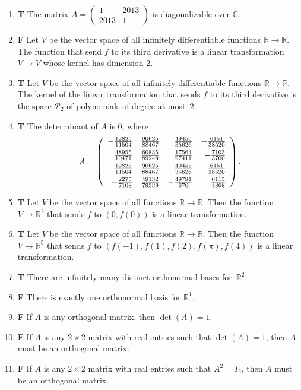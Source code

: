 \documentclass[12pt]{article}
\newcommand{\tf}[2]{\item {\bf {\color{blue}\hspace{1em}#1}}\hspace{1em} #2}
\newcommand{\R}{\mathbb{R}}
\newcommand{\C}{\mathbb{C}}
\begin{document}
\begin{enumerate}
\tf{T}{The matrix $A=\left(\begin{array}{rr}
1 & 2013 \\
2013 & 1
\end{array}\right)$ is diagonalizable over $\C$.}

\tf{F}{Let $V$ be the vector space of all infinitely differentiable functions $\R\to \R$.
The function that send $f$ to its third derivative is a linear transformation $V\to V$ whose
kernel has dimension $2$.}

\tf{T}{Let $V$ be the vector space of all infinitely differentiable functions $\R\to \R$.
The kernel of the linear transformation that sends $f$ to its third derivative is
the space $\mathcal{P}_{2}$ of polynomials of degree at most~$2$.}

\tf{T}{The determinant of $A$ is $0$, where $$A=\left(\begin{array}{rrrr}
-\frac{12825}{11504} & \frac{90625}{88467} & \frac{49455}{35626} & -\frac{6151}{38520}\vspace{1ex}\\
\frac{48955}{10471} & \frac{60835}{89249} & \frac{17564}{97411} & -\frac{7103}{3700} \vspace{1ex}\\
-\frac{12825}{11504} & \frac{90625}{88467} & \frac{49455}{35626} & -\frac{6151}{38520}\vspace{1ex}\\
-\frac{2275}{7108} & \frac{49132}{79339} & -\frac{49791}{670} & \frac{6115}{4868}
\end{array}\right).$$}

\tf{T}{Let $V$ be the vector space of all functions $\R\to\R$.  Then the function $V\to \R^2$ that sends $f$ to $(0, f(0))$
is a linear transformation.}

\tf{T}{Let $V$ be the vector space of all functions $\R\to\R$.  Then the function $V\to \R^5$ that sends $f$ to $(f(-1),f(1),f(2),f(\pi),f(4))$
is a linear transformation.}

\tf{T}{There are infinitely many distinct orthonormal bases for~$\R^2$.}

\tf{F}{There is exactly one orthonormal basis for $\R^1$.}

\tf{F}{If $A$ is any orthogonal matrix, then $\det(A)=1$.}

\tf{F}{If $A$ is any $2\times 2$ matrix with real entries such that $\det(A)=1$, then $A$ must be an orthogonal matrix.}

\tf{F}{If $A$ is any $2\times 2$ matrix with real entries such that $A^2=I_2$, then $A$ must be an orthogonal matrix.}


\end{enumerate}
\end{document}
